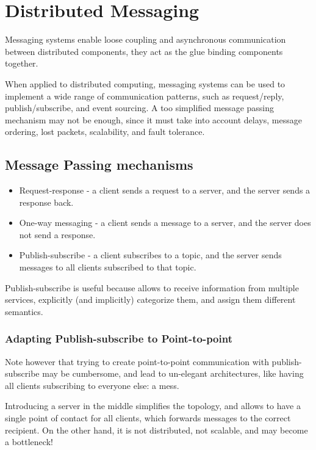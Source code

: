 \chapter{Distributed Messaging}
Messaging systems enable loose coupling and asynchronous communication between distributed components, they act as the glue binding components together.

When applied to distributed computing, messaging systems can be used to implement a wide range of communication patterns, such as request/reply, publish/subscribe, and event sourcing.
A too simplified message passing mechanism may not be enough, since it must take into account delays, message ordering, lost packets, scalability, and fault tolerance.

\section{Message Passing mechanisms}

\begin{itemize}
   \item Request-response - a client sends a request to a server, and the server sends a response back.
   \item One-way messaging - a client sends a message to a server, and the server does not send a response.
   \item Publish-subscribe - a client subscribes to a topic, and the server sends messages to all clients subscribed to that topic.
\end{itemize}


Publish-subscribe is useful because allows to receive information from multiple services, explicitly (and implicitly) categorize them, and assign them different semantics.

\subsection{Adapting Publish-subscribe to Point-to-point}
Note however that trying to create point-to-point communication with publish-subscribe may be cumbersome, and lead to un-elegant architectures, like having all clients subscribing to everyone else: a mess.

Introducing a server in the middle simplifies the topology, and allows to have a single point of contact for all clients, which forwards messages to the correct recipient.
On the other hand, it is not distributed, not scalable, and may become a bottleneck!

